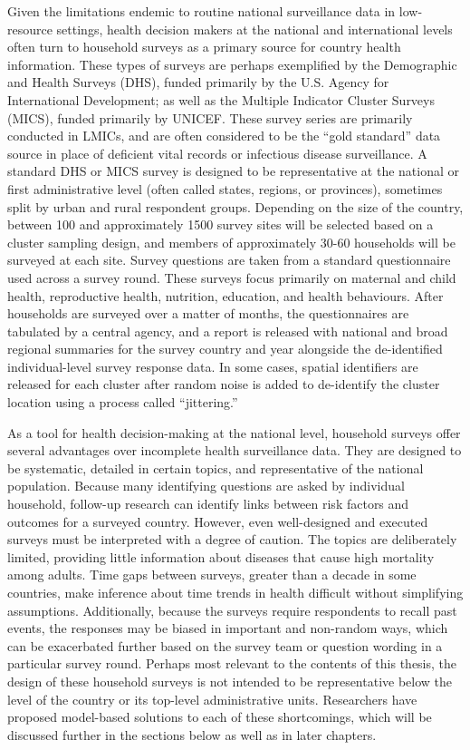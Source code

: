 \documentclass[
]{report}
\begin{document}
Given the limitations endemic to routine national surveillance data in low-resource settings, health decision makers at the national and international levels often turn to household surveys as a primary source for country health information. These types of surveys are perhaps exemplified by the Demographic and Health Surveys (DHS),\autocite{Corsi2012} funded primarily by the U.S. Agency for International Development; as well as the Multiple Indicator Cluster Surveys (MICS),\autocite{Khan2019} funded primarily by UNICEF. These survey series are primarily conducted in LMICs, and are often considered to be the ``gold standard'' data source in place of deficient vital records or infectious disease surveillance. A standard DHS or MICS survey is designed to be representative at the national or first administrative level (often called states, regions, or provinces), sometimes split by urban and rural respondent groups. Depending on the size of the country, between 100 and approximately 1500 survey sites will be selected based on a cluster sampling design, and members of approximately 30-60 households will be surveyed at each site. Survey questions are taken from a standard questionnaire used across a survey round. These surveys focus primarily on maternal and child health, reproductive health, nutrition, education, and health behaviours. After households are surveyed over a matter of months, the questionnaires are tabulated by a central agency, and a report is released with national and broad regional summaries for the survey country and year alongside the de-identified individual-level survey response data. In some cases, spatial identifiers are released for each cluster after random noise is added to de-identify the cluster location using a process called ``jittering.''

As a tool for health decision-making at the national level, household surveys offer several advantages over incomplete health surveillance data. They are designed to be systematic, detailed in certain topics, and representative of the national population. Because many identifying questions are asked by individual household, follow-up research can identify links between risk factors and outcomes for a surveyed country. However, even well-designed and executed surveys must be interpreted with a degree of caution. The topics are deliberately limited, providing little information about diseases that cause high mortality among adults. Time gaps between surveys, greater than a decade in some countries, make inference about time trends in health difficult without simplifying assumptions. Additionally, because the surveys require respondents to recall past events, the responses may be biased in important and non-random ways, which can be exacerbated further based on the survey team or question wording in a particular survey round. Perhaps most relevant to the contents of this thesis, the design of these household surveys is not intended to be representative below the level of the country or its top-level administrative units. Researchers have proposed model-based solutions to each of these shortcomings, which will be discussed further in the sections below as well as in later chapters.
\end{document}
